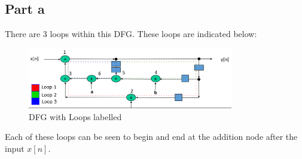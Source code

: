 \subsection{Part a}

There are 3 loops within this DFG. These loops are indicated below:

\begin{figure}[H]
	\centering
	\includegraphics[width=0.8\textwidth]{images/DFGLoop}
	\caption{DFG with Loops labelled}
	\label{fig:images-DFGLoop}
\end{figure}

Each of these loops can be seen to begin and end at the addition node after
the input $x[n]$.
